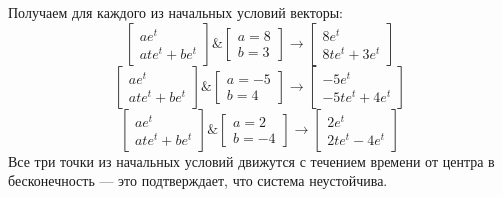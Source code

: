 \documentclass[a3paper,14pt]{extarticle}
\begin{document}
Получаем для каждого из начальных условий векторы: $$\begin{bmatrix}
    ae^t \\ ate^t + be^t
\end{bmatrix} \& \begin{bmatrix}
    a = 8 \\ b = 3
\end{bmatrix} \rightarrow \begin{bmatrix}
    8e^t \\ 8te^t + 3e^t
\end{bmatrix}$$$$\begin{bmatrix}
    ae^t \\ ate^t + be^t
\end{bmatrix} \& \begin{bmatrix}
    a=-5 \\b= 4
\end{bmatrix} \rightarrow \begin{bmatrix}
    -5e^t \\ -5te^t + 4e^t
\end{bmatrix}$$
$$\begin{bmatrix}
    ae^t \\ ate^t + be^t
\end{bmatrix} \& \begin{bmatrix}
    a=2 \\ b=-4
\end{bmatrix} \rightarrow \begin{bmatrix}
    2e^t \\ 2te^t - 4e^t
\end{bmatrix}$$
Все три точки из начальных условий движутся с течением времени от центра в бесконечность --- это подтверждает, что система неустойчива.
\end{document}
